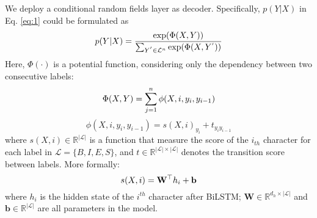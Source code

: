 We deploy a conditional random fields layer as decoder. Specifically, $p(Y | X)$ in Eq. \eqref{eq:1} could be formulated as
\begin{equation}
\small
p(Y | X) = \frac{\exp(\Phi(X, Y))}{\sum_{Y^{'} \in \mathcal{L}^n}\exp(\Phi(X, Y^{'}))}
\end{equation}
\noindent Here, $\Phi(\cdot)$ is a potential function, considering
only the dependency between two consecutive labels:
\begin{equation}
\small
\Phi(X, Y) = \sum_{j=1}^{n}\phi(X, i, y_i, y_{i-1})
\end{equation}
\begin{equation}
\phi(X, i, y_i, y_{i-1}) = s(X, i)_{y_i} + t_{y_{i}y_{i-1}}
\end{equation}
\noindent where $s(X, i) \in \mathbb{R}^{|\mathcal{L}|}$ is a function that measure the score of the $i_{th}$ character for each label in $\mathcal{L} = \{B, I, E, S\}$, and $t \in \mathbb{R}^{|\mathcal{L}|\times|\mathcal{L}|}$ denotes the transition score between labels. More formally:
\begin{equation}
\small
s(X, i) = \mathbf{W}^\top h_i + \mathbf{b} 
\end{equation}
\noindent where $h_i$ is the hidden state of the $i^{th}$ character after BiLSTM; $\mathbf{W} \in \mathbb{R}^{d_h \times |\mathcal{L}|}$ and $\mathbf{b} \in \mathbb{R}^{|\mathcal{L}|}$ are all parameters in the model.
